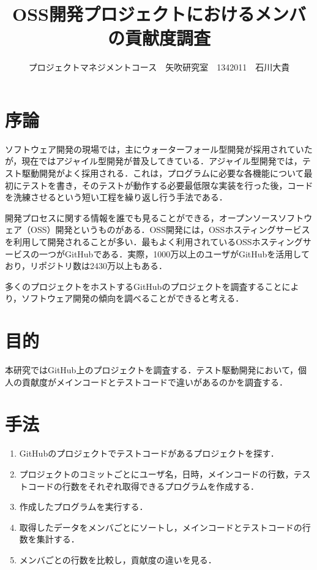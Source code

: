 \documentclass[uplatex,twocolumn,dvipdfmx]{jsarticle}
\title{\vspace{-5mm}\fontsize{14pt}{0pt}\selectfont OSS開発プロジェクトにおけるメンバの貢献度調査}
\author{\normalsize プロジェクトマネジメントコース　矢吹研究室　1342011　石川大貴}
\date{}
\begin{document}
\fontsize{10.5pt}{\baselineskip}\selectfont
\maketitle





\section{序論}

ソフトウェア開発の現場では，主にウォーターフォール型開発が採用されていたが，現在ではアジャイル型開発が普及してきている．アジャイル型開発では，テスト駆動開発がよく採用される．これは，プログラムに必要な各機能について最初にテストを書き，そのテストが動作する必要最低限な実装を行った後，コードを洗練させるという短い工程を繰り返し行う手法である\cite{shimizu2012}．

開発プロセスに関する情報を誰でも見ることができる，オープンソースソフトウェア（OSS）開発というものがある．OSS開発には，OSSホスティングサービスを利用して開発されることが多い．最もよく利用されているOSSホスティングサービスの一つがGitHubである．実際，1000万以上のユーザがGitHubを活用しており，リポジトリ数は2430万以上もある\cite{github}．

多くのプロジェクトをホストするGitHubのプロジェクトを調査することにより，ソフトウェア開発の傾向を調べることができると考える．


\section{目的}

本研究ではGitHub上のプロジェクトを調査する．テスト駆動開発において，個人の貢献度がメインコードとテストコードで違いがあるのかを調査する．


\section{手法}

\begin{enumerate}
\item GitHubのプロジェクトでテストコードがあるプロジェクトを探す．
\item プロジェクトのコミットごとにユーザ名，日時，メインコードの行数，テストコードの行数をそれぞれ取得できるプログラムを作成する．
\item 作成したプログラムを実行する．
\item 取得したデータをメンバごとにソートし，メインコードとテストコードの行数を集計する．
\item メンバごとの行数を比較し，貢献度の違いを見る．
\end{enumerate}
\end{document}
